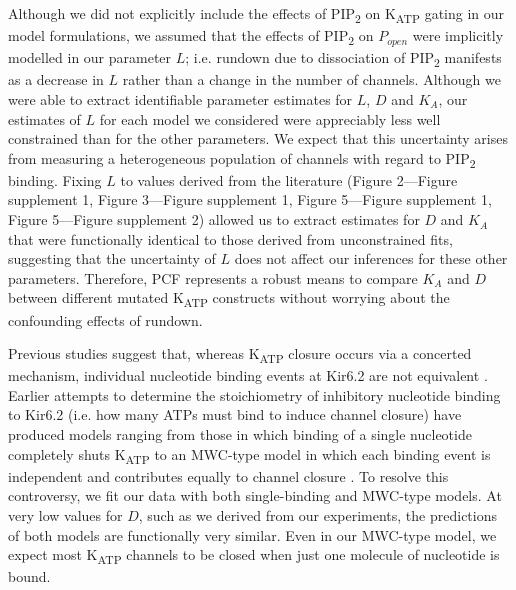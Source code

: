 \documentclass[10pt,lineno, doublespacing]{elife_modified}
\begin{document}
Although we did not explicitly include the effects of PIP\textsubscript{2} on K\textsubscript{ATP} gating in our model formulations, we assumed that the effects of PIP\textsubscript{2} on $P_{open}$ were implicitly modelled in our parameter $L$; i.e. rundown due to dissociation of PIP\textsubscript{2} manifests as a decrease in $L$ rather than a change in the number of channels.
Although we were able to extract identifiable parameter estimates for $L$, $D$ and $K_A$, our estimates of $L$ for each model we considered were appreciably less well constrained than for the other parameters.
We expect that this uncertainty arises from measuring a heterogeneous population of channels with regard to PIP\textsubscript{2} binding.
Fixing $L$ to values derived from the literature (Figure 2—Figure supplement 1, Figure 3—Figure supplement 1, Figure 5—Figure supplement 1, Figure 5—Figure supplement 2) allowed us to extract estimates for $D$ and $K_A$ that were functionally identical to those derived from unconstrained fits, suggesting that the uncertainty of $L$ does not affect our inferences for these other parameters.
Therefore, PCF represents a robust means to compare $K_A$ and $D$ between different mutated K\textsubscript{ATP} constructs without worrying about the confounding effects of rundown.

Previous studies suggest that, whereas K\textsubscript{ATP} closure occurs via a concerted mechanism, individual nucleotide binding events at Kir6.2 are not equivalent \citep{RN102}.
Earlier attempts to determine the stoichiometry of inhibitory nucleotide binding to Kir6.2 (i.e. how many ATPs must bind to induce channel closure) have produced models ranging from those in which binding of a single nucleotide completely shuts K\textsubscript{ATP} to an MWC-type model in which each binding event is independent and contributes equally to channel closure \citep{RN92, RN102, RN89, RN101, RN115, RN90, RN3}.
To resolve this controversy, we fit our data with both single-binding and MWC-type models.
At very low values for $D$, such as we derived from our experiments, the predictions of both models are functionally very similar.
Even in our MWC-type model, we expect most K\textsubscript{ATP} channels to be closed when just one molecule of nucleotide is bound.
\end{document}
